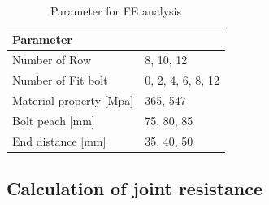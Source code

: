 \begin{table}[]
    \centering
\caption{Parameter for FE analysis}
\begin{tabular}{@{}ll@{}}
\toprule
Parameter                   &              \\ \midrule
Number of Row               & 8, 10, 12      \\
Number of Fit bolt          & 0, 2, 4, 6, 8, 12 \\
Material property {[}Mpa{]} & 365, 547     \\
Bolt peach [mm]             & 75, 80, 85     \\
End distance  [mm]          & 35, 40, 50     \\ \bottomrule
\end{tabular}
\label{tab-cases}
\end{table}

\subsection{Calculation of joint resistance}

